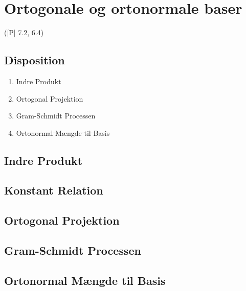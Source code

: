 \newpage
\chapter{Ortogonale og ortonormale baser}
([P] 7.2, 6.4)

\section*{Disposition}
\begin{enumerate}
	\item Indre Produkt
	\item Ortogonal Projektion
	\item Gram-Schmidt Processen
	\item \sout{Ortonormal Mængde til Basis}
\end{enumerate}

\section{Indre Produkt}

\section*{Konstant Relation}

\section{Ortogonal Projektion}
\hypertarget{6.1.14}{}

\section{Gram-Schmidt Processen}

\section{Ortonormal Mængde til Basis}

